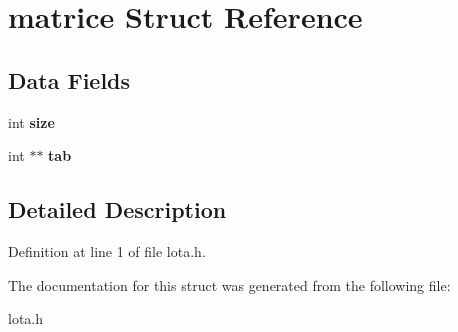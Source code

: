 \hypertarget{structmatrice}{}\section{matrice Struct Reference}
\label{structmatrice}
\subsection*{Data Fields}
\begin{DoxyCompactItemize}
\item 
int {\bfseries size}\hypertarget{structmatrice_a439227feff9d7f55384e8780cfc2eb82}{}\label{structmatrice_a439227feff9d7f55384e8780cfc2eb82}

\item 
int $\ast$$\ast$ {\bfseries tab}\hypertarget{structmatrice_ad49bf24c5f929d1ed8e22fee5935834b}{}\label{structmatrice_ad49bf24c5f929d1ed8e22fee5935834b}

\end{DoxyCompactItemize}


\subsection{Detailed Description}


Definition at line 1 of file lota.\+h.



The documentation for this struct was generated from the following file\+:\begin{DoxyCompactItemize}
\item 
lota.\+h\end{DoxyCompactItemize}
